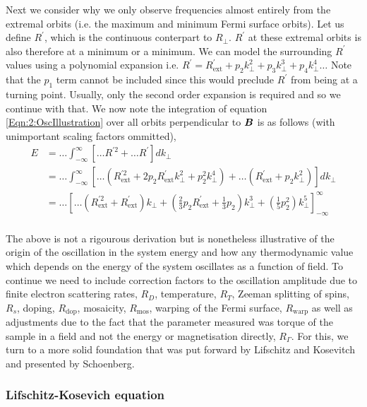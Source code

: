 Next we consider why we only observe frequencies almost entirely from the extremal orbits (i.e. the maximum and minimum Fermi surface orbits). Let us define $R^\prime$, which is the continuous conterpart to $R_\perp$. $R^\prime$ at these extremal orbits is also therefore at a minimum or a minimum. We can model the surrounding $R^\prime$ values using a polynomial expansion i.e. $R^\prime = R^\prime_{\textrm{ext}} + p_2 k_\perp^2 + p_3 k_\perp^3 + p_4 k_\perp^4 \ldots$ Note that the $p_1$ term cannot be included since this would preclude $R^\prime$ from being at a turning point. Usually, only the second order expansion is required and so we continue with that. We now note the integration of equation \ref{Eqn:2:OscIllustration} over all orbits perpendicular to $\boldsymbol{B}$ is as follows (with unimportant scaling factors ommitted),
\begin{align*}
E &= \ldots \int_{-\infty}^{\infty}\left[\ldots R^{\prime 2} + \ldots R^\prime\right]dk_\perp \\
  &= \ldots \int_{-\infty}^{\infty}\left[\ldots(R^{\prime 2}_{\textrm{ext}} + 2p_2 R^\prime_{\textrm{ext}} k_\perp^2 + p_2^2 k_\perp^4) + \ldots (R^\prime_{\textrm{ext}} + p_2 k_\perp^2) \right]dk_\perp \\
 &= \ldots\left[\ldots(R^{\prime 2}_{\textrm{ext}} + R^\prime_{\textrm{ext}})k_\perp + \left(\frac{2}{3}p_2R^\prime_{\textrm{ext}} + \frac{1}{3}p_2\right) k_\perp^3 + \left(\frac{1}{5}p_2^2 \right) k_\perp^5  \right]^{\infty}_{-\infty} \\
\end{align*}



The above is not a rigourous derivation but is nonetheless illustrative of the origin of the oscillation in the system energy and how any thermodynamic value which depends on the energy of the system oscillates as a function of field. To continue we need to include correction factors to the oscillation amplitude due to finite electron scattering rates, $R_D$, temperature, $R_T$, Zeeman splitting of spins, $R_s$, doping, $R_{\textrm{dop}}$, mosaicity, $R_{\textrm{mos}}$, warping of the Fermi surface, $R_{\textrm{warp}}$ as well as adjustments due to the fact that the parameter measured was torque of the sample in a field and not the energy or magnetisation directly, $R_{\Gamma}$. For this, we turn to a more solid foundation that was put forward by Lifschitz and Kosevitch and presented by Schoenberg.

\subsubsection{Lifschitz-Kosevich equation}


